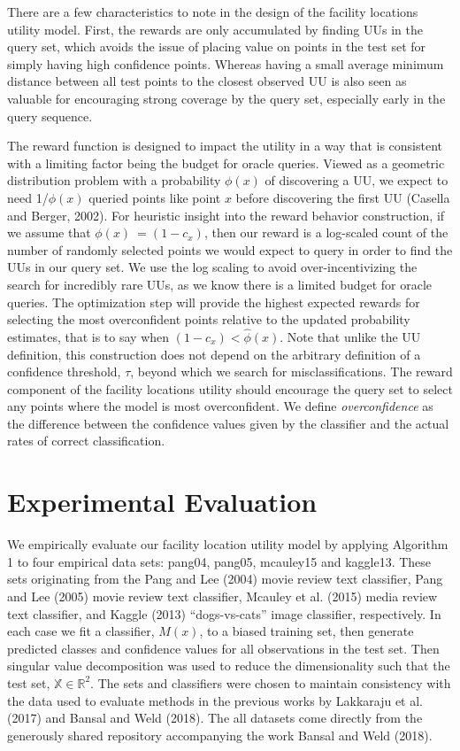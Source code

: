 \documentclass[letterpaper]{article} %
\newcommand{\km}[1]{{\color{red} #1}} %
\begin{document}
There are a few characteristics to note in the design of the facility locations utility model. First, the rewards are only accumulated by finding UUs in the query set, which avoids the issue of placing value on points in the test set for simply having high confidence points. Whereas having a small average minimum distance between all test points to the closest observed UU is also seen as valuable for encouraging strong coverage by the query set, especially early in the query sequence. 

The reward function is designed to impact the utility in a way that is consistent with a limiting factor being the budget for oracle queries. Viewed as a geometric distribution problem with a probability $\phi(x)$ of discovering a UU, we expect to need 1/$\phi(x)$ queried points like point $x$ before discovering the first UU \km{(Casella and Berger, 2002)}. For heuristic insight into the reward behavior construction, if we assume that   $\phi(x) ~= (1-c_x )$, then our reward is a log-scaled count of the number of randomly selected points we would expect to query in order to find the UUs in our query set. We use the log scaling to avoid over-incentivizing the search for incredibly rare UUs, as we know there is a limited budget for oracle queries. The optimization step will provide the highest expected rewards for selecting the most overconfident points relative to the updated probability estimates, that is to say when $(1-c_x )< \hat{\phi}(x)$. Note that unlike the UU definition, this construction does not depend on the arbitrary definition of a confidence threshold, $\tau$, beyond which we search for misclassifications. The reward component of the facility locations utility should encourage the query set to select any points where the model is most overconfident. We define \textit{overconfidence} as the difference between the confidence values given by the classifier and the actual rates of correct classification. 


\section{Experimental Evaluation}

We empirically evaluate our facility location utility model by applying Algorithm 1 to four empirical data sets: pang04, pang05, mcauley15 and kaggle13. These sets originating from the \km{Pang and Lee (2004) movie review text classifier, Pang and Lee (2005) movie review text classifier, Mcauley et al. (2015) media review text classifier, and Kaggle (2013) “dogs-vs-cats” image classifier}, respectively. In each case we fit a classifier, $M(x)$, to a biased training set, then generate predicted classes and confidence values for all observations in the test set. Then singular value decomposition was used to reduce the dimensionality such that the test set, $\mathbb{X} \in \mathbb{R}^2$. The sets and classifiers were chosen to maintain consistency with the data used to evaluate methods in the previous works by Lakkaraju et al. (2017) and Bansal and Weld (2018). The all datasets come directly from the generously shared repository accompanying the work Bansal and Weld (2018). 
\end{document}
